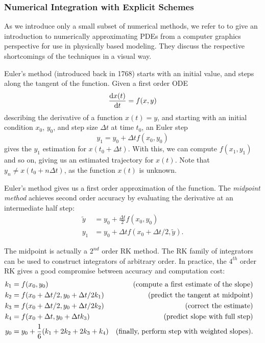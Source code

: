 \subsubsection*{Numerical Integration with Explicit Schemes}
\label{section:numerical-integration}
As we introduce only a small subset of numerical methods, we refer to
\citet{Baraff1997PhysicallyBM} to give an introduction to numerically
approximating \acfp{PDE} from a computer graphics perspective for use in
physically based modeling. They discuss the respective shortcomings of the
techniques in a visual way.

Euler's method (introduced back in 1768) starts with an initial value, and steps
along the tangent of the function. Given a first order \acf{ODE} 
$$\dv{x(t)}{t} = f(x,y)$$ describing the derivative of a function $x(t) = y$,
and starting with an initial condition $x_0$, $y_0$, and step size
$\Delta t$ at time $t_0$,
an Euler step 
$$y_1 = y_0 + \Delta t f(x_0, y_0)$$
gives the $y_1$ estimation for $x(t_0 + \Delta t)$. With this, we can compute
$f(x_1, y_1)$ and so on, giving us an estimated trajectory for $x(t)$. Note that
$y_n \neq x(t_0 + n \Delta t)$, as the function $x(t)$ is unknown. 

Euler's method gives us a first order approximation of the function. The
\textit{midpoint method} achieves second order accuracy by evaluating the
derivative at an intermediate half step:
\begin{align*}\label{eq:midpoint}
  \tilde{y} &= y_0 + \frac{\Delta t}{2} f(x_0, y_0) \\
  y_1 &= y_0 + \Delta t f(x_0+ \Delta t /2, \tilde{y}).
\end{align*}

The midpoint is actually a $2^{nd}$ order \acf{RK} method. The \ac{RK}
family of integrators can be used to construct integrators of arbitrary order.
In practice, the $4^{th}$ order \ac{RK} gives a good compromise between accuracy
and computation cost:
\begin{align*}
  k_1 &= f(x_0, y_0) 
      &\qq*{(compute a first estimate of the slope)}\\
  k_2 &= f(x_0+\Delta t/2, y_0+\Delta t / 2 k_1) 
      &\qq*{(predict the tangent at midpoint)}\\
  k_3 &= f(x_0+\Delta t/2, y_0+\Delta t / 2 k_2) 
      &\qq*{(correct the estimate)}\\
  k_4 &= f(x_0+\Delta t, y_0+\Delta t k_3) 
      &\qq*{(predict slope with full step)}\\
  y_0 &= y_0 + \frac{1}{6}(k_1 + 2k_2 + 2k_3 + k_4) 
      &\qq*{(finally, perform step with weighted slopes).}
\end{align*}


